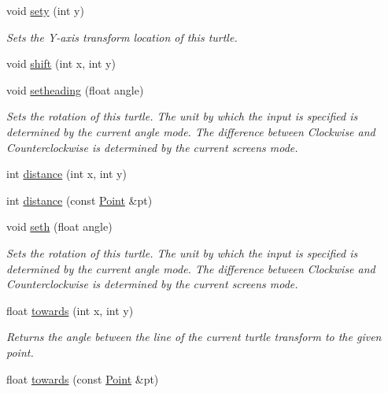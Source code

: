 \begin{DoxyCompactItemize}
\mbox{\label{classcturtle_1_1Turtle_aeee8075a33445d89a060c4faa17f9e5c}} 
void \hyperlink{classcturtle_1_1Turtle_aeee8075a33445d89a060c4faa17f9e5c}{sety} (int y)
\begin{DoxyCompactList}\small\item\em Sets the Y-\/axis transform location of this turtle. \end{DoxyCompactList}\item 
void \hyperlink{classcturtle_1_1Turtle_aea45fc1d0f00b82fc64a0f97dd6c1ea2}{shift} (int x, int y)
\item 
void \hyperlink{classcturtle_1_1Turtle_a4eb2630341ea5bb922c74f214037b361}{setheading} (float angle)
\begin{DoxyCompactList}\small\item\em Sets the rotation of this turtle. The unit by which the input is specified is determined by the current angle mode. The difference between Clockwise and Counterclockwise is determined by the current screen\textquotesingle{}s mode. \end{DoxyCompactList}\item 
int \hyperlink{classcturtle_1_1Turtle_a4a6824b53f70323402d4e972f6da360c}{distance} (int x, int y)
\item 
int \hyperlink{classcturtle_1_1Turtle_aa8b64c7361639dec2eafedaf640a0ebd}{distance} (const \hyperlink{structcturtle_1_1ivec2}{Point} \&pt)
\item 
void \hyperlink{classcturtle_1_1Turtle_a2f578819830001dfb6694813f9a4aa19}{seth} (float angle)
\begin{DoxyCompactList}\small\item\em Sets the rotation of this turtle. The unit by which the input is specified is determined by the current angle mode. The difference between Clockwise and Counterclockwise is determined by the current screen\textquotesingle{}s mode. \end{DoxyCompactList}\item 
float \hyperlink{classcturtle_1_1Turtle_a1ac8961a3d5d3044b3f3f011778b51bf}{towards} (int x, int y)
\begin{DoxyCompactList}\small\item\em Returns the angle between the line of the current turtle transform to the given point. \end{DoxyCompactList}\item 
float \hyperlink{classcturtle_1_1Turtle_ab625cf304b44417c7d3cacd65b372d37}{towards} (const \hyperlink{structcturtle_1_1ivec2}{Point} \&pt)

\end{DoxyCompactItemize}
